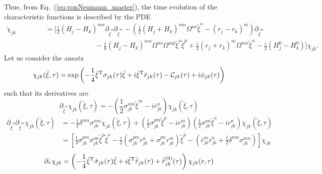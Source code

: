 \documentclass[%
reprint,
superscriptaddress,
nofootinbib,
 amsmath,amssymb,
prx,
floatfix,
]{revtex4-2}
\begin{document}
Thus, from Eq.~(\ref{eq:vonNeumann_master}), the time evolution of the characteristic functions is described by the  PDE
 \begin{align}
 \label{eq:PDE_chara_general}
     \dot{\chi}_{jk} &= \Big[ \frac{i}{2} (H_j - H_k)^{mn} \partial_{\tilde{\xi}^n} \partial_{\tilde{\xi}^m}  - \left(  \frac{1}{2}  ( H_j + H_k )^{mn} \Omega^{n o} \tilde{\xi}^o  - (r_j - r_k)^m \right)  \partial_{\tilde{\xi}^m} \nonumber \\
     \hspace{2cm } &\hspace{3cm}- \frac{i}{8} (H_j - H_k)^{mn} \Omega^{n o} \Omega^{m p} \tilde{\xi}^o \tilde{\xi}^p  + \frac{i}{2} (r_j + r_k)^m  \Omega^{mn} \tilde{\xi}^n - \frac{i}{2} (H_j^0-H_k^0) \Big] \chi_{jk} . 
 \end{align}
Let us consider the ansatz
\begin{equation}
    \chi_{jk} (\tilde{\xi}, \tau) =  \exp \left( -\frac{1}{4} \tilde{\xi}^{\rm T} \sigma_{jk} (\tau) \tilde{\xi}  +  i  \tilde{\xi}^{\rm T} \bar{r}_{jk} (\tau) - \mathcal{C}_{jk} (\tau)  +  i \phi_{jk} (\tau) \right) 
\end{equation}
such that its derivatives are
\begin{equation}
    \partial_{\tilde{\xi}^n} \chi_{jk} (\tilde{\xi}, \tau) = - \left( \frac{1}{2} \sigma_{jk}^{nm} \tilde{\xi}^{m} -  i r^n_{jk}  \right) \chi_{jk} (\tilde{\xi}, \tau)
\end{equation}
\begin{align*}
    \partial_{\tilde{\xi}^n} \partial_{\tilde{\xi}^m} \chi_{jk} (\tilde{\xi}, \tau) &= - \frac{1}{2} \delta^{mn} \sigma_{jk}^{mn} \chi_{jk} (\tilde{\xi}, \tau) + \left( \frac{1}{2} \sigma_{jk}^{pm} \tilde{\xi}^{p} -  i r^m_{jk}  \right) \left( \frac{1}{2} \sigma_{jk}^{on} \tilde{\xi}^{o} -  i r^n_{jk}  \right) \chi_{jk} (\tilde{\xi}, \tau) \\ 
    &= \left[\frac{1}{4} \sigma_{jk}^{pm}  \sigma_{jk}^{on} \tilde{\xi}^{p} \tilde{\xi}^{o} - \frac{i}{2} (\sigma_{jk}^{pm}  r^n_{jk} +  \sigma_{jk}^{pn}  r^m_{jk} ) \tilde{\xi}^{p}  - \left(\bar{r}_{jk}^m \bar{r}_{jk}^n + \frac{1}{2}  \delta^{mn} \sigma_{jk}^{mn} \right) \right]\chi_{jk}  
\end{align*}
\begin{equation*}
    \partial_{\tau} \chi_{jk} = \left( -\frac{1}{4} \tilde{\xi}^{\rm T} \dot{\sigma}_{jk} (\tau) \tilde{\xi}  +  i \tilde{\xi}^{\rm T} \dot{\bar{r}}_{jk} (\tau) + \dot{\bar{r}}_{jk}^{(0)}(\tau) \right) \chi_{jk} (r, \tau)
\end{equation*}
\end{document}
